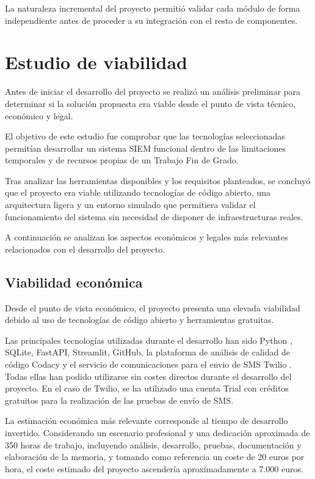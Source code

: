 La naturaleza incremental del proyecto permitió validar cada módulo de forma independiente antes de proceder a su integración con el resto de componentes.

\section{Estudio de viabilidad}

Antes de iniciar el desarrollo del proyecto se realizó un análisis preliminar para determinar si la solución propuesta era viable desde el punto de vista técnico, económico y legal.

El objetivo de este estudio fue comprobar que las tecnologías seleccionadas permitían desarrollar un sistema SIEM funcional dentro de las limitaciones temporales y de recursos propias de un Trabajo Fin de Grado.

Tras analizar las herramientas disponibles y los requisitos planteados, se concluyó que el proyecto era viable utilizando tecnologías de código abierto, una arquitectura ligera y un entorno simulado que permitiera validar el funcionamiento del sistema sin necesidad de disponer de infraestructuras reales.

A continuación se analizan los aspectos económicos y legales más relevantes relacionados con el desarrollo del proyecto.

\subsection{Viabilidad económica}

Desde el punto de vista económico, el proyecto presenta una elevada viabilidad debido al uso de tecnologías de código abierto y herramientas gratuitas.

Las principales tecnologías utilizadas durante el desarrollo han sido Python \cite{python}, SQLite, FastAPI, Streamlit, GitHub, la plataforma de análisis de calidad de código Codacy \cite{codacy} y el servicio de comunicaciones para el envio de SMS Twilio \cite{twilio}. Todas ellas han podido utilizarse sin costes directos durante el desarrollo del proyecto. En el caso de Twilio, se ha utilizado una cuenta Trial con créditos gratuitos para la realización de las pruebas de envío de SMS.

La estimación económica más relevante corresponde al tiempo de desarrollo invertido. Considerando un escenario profesional y una dedicación aproximada de 350 horas de trabajo, incluyendo análisis, desarrollo, pruebas, documentación y elaboración de la memoria, y tomando como referencia un coste de 20 euros por hora, el coste estimado del proyecto ascendería aproximadamente a 7.000 euros.

